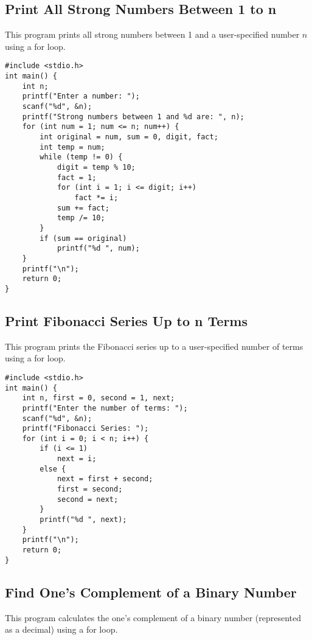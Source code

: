 \documentclass[a4paper,12pt]{article}
\begin{document}
\newpage

\subsection{Print All Strong Numbers Between 1 to n}
This program prints all strong numbers between 1 and a user-specified number \(n\) using a for loop.

\begin{lstlisting}[caption={Print All Strong Numbers Between 1 to n}]
#include <stdio.h>
int main() {
    int n;
    printf("Enter a number: ");
    scanf("%d", &n);
    printf("Strong numbers between 1 and %d are: ", n);
    for (int num = 1; num <= n; num++) {
        int original = num, sum = 0, digit, fact;
        int temp = num;
        while (temp != 0) {
            digit = temp % 10;
            fact = 1;
            for (int i = 1; i <= digit; i++)
                fact *= i;
            sum += fact;
            temp /= 10;
        }
        if (sum == original)
            printf("%d ", num);
    }
    printf("\n");
    return 0;
}
\end{lstlisting}

\newpage

\subsection{Print Fibonacci Series Up to n Terms}
This program prints the Fibonacci series up to a user-specified number of terms using a for loop.

\begin{lstlisting}[caption={Print Fibonacci Series Up to n Terms}]
#include <stdio.h>
int main() {
    int n, first = 0, second = 1, next;
    printf("Enter the number of terms: ");
    scanf("%d", &n);
    printf("Fibonacci Series: ");
    for (int i = 0; i < n; i++) {
        if (i <= 1)
            next = i;
        else {
            next = first + second;
            first = second;
            second = next;
        }
        printf("%d ", next);
    }
    printf("\n");
    return 0;
}
\end{lstlisting}

\newpage

\subsection{Find One’s Complement of a Binary Number}
This program calculates the one’s complement of a binary number (represented as a decimal) using a for loop.
\end{document}
